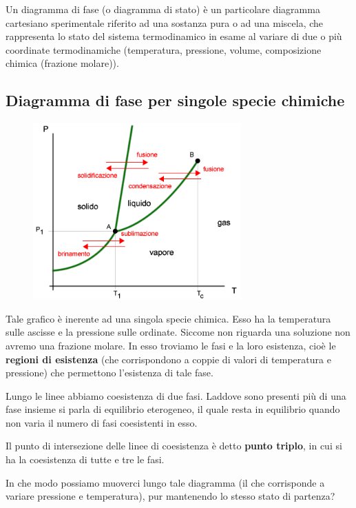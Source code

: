 Un diagramma di fase (o diagramma di stato) è un particolare diagramma cartesiano sperimentale riferito ad una sostanza pura o ad una miscela, che rappresenta lo stato del sistema termodinamico in esame al variare di due o più coordinate termodinamiche (temperatura, pressione, volume, composizione chimica (frazione molare)).

\subsection{Diagramma di fase per singole specie chimiche}

\begin{figure}[H]
    \centering
    \includegraphics[width=8cm]{immagini/diagramma_di_stato.png}
\end{figure}

Tale grafico è inerente ad una singola specie chimica. Esso ha la temperatura sulle ascisse e la pressione sulle ordinate. Siccome non riguarda una soluzione non avremo una frazione molare. In esso troviamo le fasi e la loro esistenza, cioè le \textbf{regioni di esistenza} (che corrispondono a coppie di valori di temperatura e pressione) che permettono l'esistenza di tale fase.

Lungo le linee abbiamo coesistenza di due fasi. Laddove sono presenti più di una fase insieme si parla di equilibrio eterogeneo, il quale resta in equilibrio quando non varia il numero di fasi coesistenti in esso.

Il punto di intersezione delle linee di coesistenza è detto \textbf{punto triplo}, in cui si ha la coesistenza di tutte e tre le fasi.

In che modo possiamo muoverci lungo tale diagramma (il che corrisponde a variare pressione e temperatura), pur mantenendo lo stesso stato di partenza?

